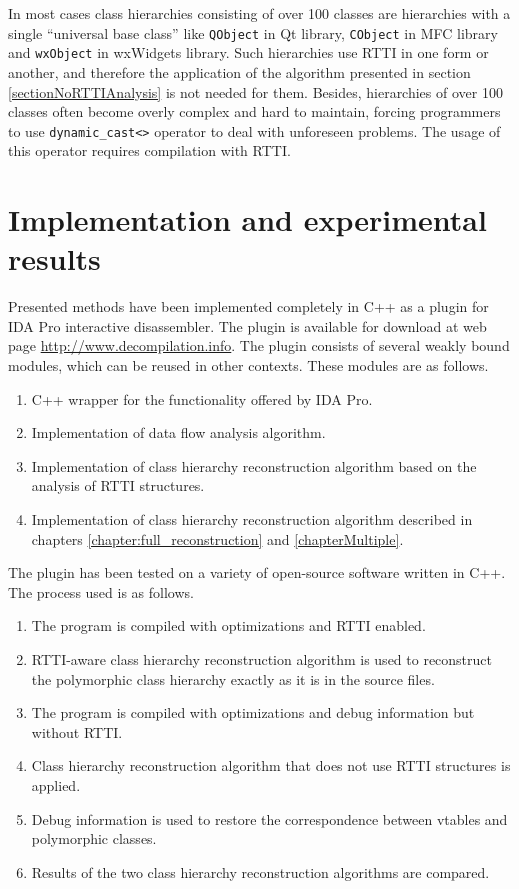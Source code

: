 \documentclass[10pt, conference]{IEEEtran}
\newcommand{\compact}{}
\begin{document}
In most cases class hierarchies consisting of over 100 classes are 
hierarchies with a single ``universal base class'' like
\lstinline{QObject} in Qt library, 
\lstinline{CObject} in MFC library
and \lstinline{wxObject} in wxWidgets library.
Such hierarchies use RTTI in one
form or another, and therefore the application of
the algorithm presented in section \ref{sectionNoRTTIAnalysis} is not
needed for them. 
Besides, hierarchies of over 100 classes often become overly
complex and hard to maintain, forcing programmers to use
\lstinline{dynamic_cast<>} operator to deal with
unforeseen problems. The usage of this operator requires compilation with RTTI. 





\quad

\section{Implementation and experimental results}\label{sectionExperiments}
Presented methods have been implemented completely in C++ as a plugin
for IDA Pro interactive disassembler. The plugin is available for
download at web page \url{http://www.decompilation.info}.
The plugin consists of several weakly bound modules, which can be reused
in other contexts. These modules are as follows.
\begin{enumerate}\compact
\item C++ wrapper for the functionality offered by IDA Pro.
\item Implementation of data flow analysis algorithm.
\item Implementation of class hierarchy reconstruction algorithm based on the analysis of RTTI structures.
\item Implementation of class hierarchy reconstruction algorithm described in
    chapters \ref{chapter:full_reconstruction} and \ref{chapterMultiple}.
\end{enumerate}

The plugin has been tested on a variety of open-source software written in C++.
The process used is as follows.
\begin{enumerate}\compact
\item The program is compiled with optimizations and RTTI enabled.
\item RTTI-aware class hierarchy reconstruction algorithm is used to reconstruct
    the polymorphic class hierarchy exactly as it is in the source files.
\item The program is compiled with optimizations and debug information but without RTTI.
\item Class hierarchy reconstruction algorithm that does not use RTTI structures
    is applied.
\item Debug information is used to restore the correspondence between vtables and
    polymorphic classes.
\item Results of the two class hierarchy reconstruction algorithms are compared.
\end{enumerate}
\end{document}

